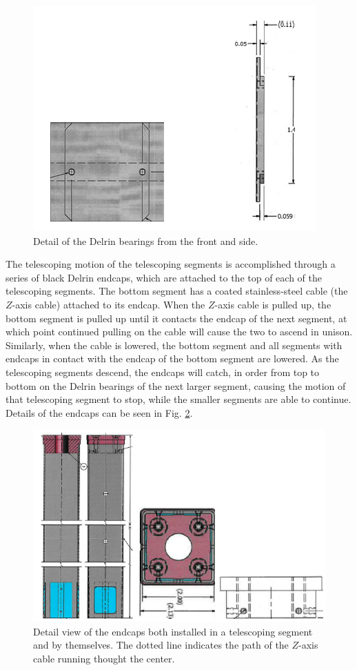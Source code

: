 \begin{figure}
\includegraphics[width=.5 \textwidth]{AA/Delrin_Detail.jpg}
\caption{Detail of the Delrin bearings from the front and side.}
\label{Delrin detail}
\end{figure}

The telescoping motion of the telescoping segments is accomplished through a series of black Delrin endcaps, which are attached to the top of each of the telescoping segments. The bottom segment has a coated stainless-steel cable (the $Z$-axis cable) attached to its endcap. When the $Z$-axis cable is pulled up, the bottom segment is pulled up until it contacts the endcap of the next segment, at which point continued pulling on the cable will cause the two to ascend in unison. Similarly, when the cable is lowered, the bottom segment and all segments with endcaps in contact with the endcap of the bottom segment are lowered. As the telescoping segments descend, the endcaps will catch, in order from top to bottom on the Delrin bearings of the next larger segment, causing the motion of that telescoping segment to stop, while the smaller segments are able to continue. Details of the endcaps can be seen in Fig. \ref{Endcaps}.

\begin{figure}
\includegraphics[width=.5 \textwidth]{AA/Endcaps.jpg}
\caption{Detail view of the endcaps both installed in a telescoping segment and by themselves. The dotted line indicates the path of the $Z$-axis cable running thought the center.} 
\label{Endcaps}
\end{figure}

